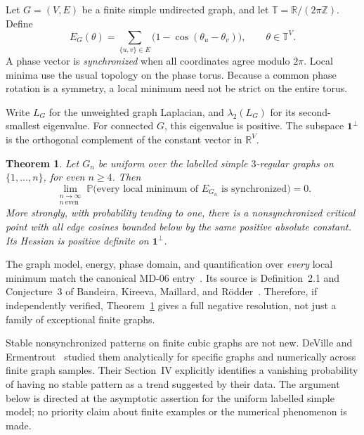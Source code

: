 \documentclass[11pt]{article}
\newtheorem{theorem}{Theorem}
\theoremstyle{definition}
\theoremstyle{remark}
\newcommand{\R}{\mathbb R}
\newcommand{\T}{\mathbb T}
\newcommand{\one}{\mathbf 1}
\newcommand{\Pp}{\mathbb P}
\begin{document}
Let $G=(V,E)$ be a finite simple undirected graph, and let
$\T=\R/(2\pi\mathbb Z)$. Define
\begin{equation}\label{eq:energy}
 E_G(\theta)=\sum_{\{u,v\}\in E}\bigl(1-\cos(\theta_u-\theta_v)\bigr),
 \qquad \theta\in\T^{V}.
\end{equation}
A phase vector is \emph{synchronized} when all coordinates agree modulo
$2\pi$. Local minima use the usual topology on the phase torus. Because a
common phase rotation is a symmetry, a local minimum need not be strict on
the entire torus.

Write $L_G$ for the unweighted graph Laplacian, and $\lambda_2(L_G)$ for its
second-smallest eigenvalue. For connected $G$, this eigenvalue is positive.
The subspace $\one^\perp$ is the orthogonal complement of the constant vector
in $\R^{V}$.

\begin{theorem}\label{thm:main}
Let $G_n$ be uniform over the labelled simple $3$-regular graphs on
$\{1,\ldots,n\}$, for even $n\ge4$. Then
\begin{equation}\label{eq:main}
 \lim_{\substack{n\to\infty\\ n\ \mathrm{even}}}
 \Pp\bigl(\text{every local minimum of }E_{G_n}
                \text{ is synchronized}\bigr)=0.
\end{equation}
More strongly, with probability tending to one, there is a nonsynchronized
critical point with all edge cosines bounded below by the same positive
absolute constant. Its Hessian is positive definite on $\one^\perp$.
\end{theorem}

The graph model, energy, phase domain, and quantification over \emph{every}
local minimum match the canonical MD-06 entry~\cite{repo}. Its source is
Definition~2.1 and Conjecture~3 of Bandeira, Kireeva, Maillard, and
R\"odder~\cite{randomstrasse}. Therefore, if independently verified,
Theorem~\ref{thm:main} gives a full negative resolution, not just a family
of exceptional finite graphs.

Stable nonsynchronized patterns on finite cubic graphs are not new.
DeVille and Ermentrout~\cite{deville} studied them analytically for specific
graphs and numerically across finite graph samples. Their Section~IV
explicitly identifies a vanishing probability of having no stable pattern
as a trend suggested by their data. The argument below is directed at the
asymptotic assertion for the uniform labelled simple model; no priority
claim about finite examples or the numerical phenomenon is made.
\end{document}
